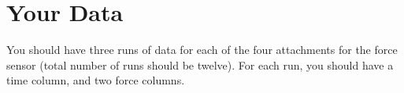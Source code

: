 \section{Your Data}
%
You should have three runs of data for each of the four attachments for the force sensor (total number of runs should be twelve). For each run, you should have a time column, and two force columns. 
%
